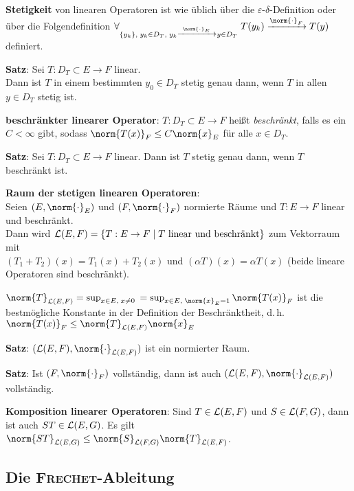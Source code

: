 \textbf{Stetigkeit} von linearen Operatoren ist wie üblich über die
$\varepsilon$-$\delta$-Definition oder über die Folgendefinition
$\forall_{\{y_k\},\; y_k \in D_T,\;
y_k \xrightarrow{\norm{\cdot}_E} y \in D_T}\;
T(y_k) \xrightarrow{\norm{\cdot}_F} T(y)$ definiert.

\textbf{Satz}: Sei $T: D_T \subset E \rightarrow F$ linear. \\
Dann ist $T$ in einem bestimmten $y_0 \in D_T$ stetig genau dann,
wenn $T$ in allen $y \in D_T$ stetig ist.

\textbf{beschränkter linearer Operator}:
$T: D_T \subset E \rightarrow F$ heißt \emph{beschränkt},
falls es ein $C < \infty$ gibt, sodass
$\norm{T(x)}_F \le C \norm{x}_E$ für alle $x \in D_T$.

\textbf{Satz}:
Sei $T: D_T \subset E \rightarrow F$ linear.
Dann ist $T$ stetig genau dann, wenn $T$ beschränkt ist.

\linie

\textbf{Raum der stetigen linearen Operatoren}: \\
Seien $(E, \norm{\cdot}_E)$ und $(F, \norm{\cdot}_F)$ normierte Räume
und $T: E \rightarrow F$ linear und beschränkt. \\
Dann wird $\mathcal{L}(E,F) =
\{T: E \rightarrow F \;|\; T \text{ linear und beschränkt}\}$
zum Vektorraum mit \\
$(T_1 + T_2)(x) = T_1(x) + T_2(x)$ und
$(\alpha T)(x) = \alpha T(x)$ (beide lineare Operatoren sind beschränkt).

$\norm{T}_{\L(E,F)} = \sup_{x \in E,\; x \not= 0}$
$= \sup_{x \in E,\; \norm{x}_E = 1} \norm{T(x)}_F$
ist die bestmögliche Konstante in der Definition der Beschränktheit,
d.\,h. $\norm{T(x)}_F \le \norm{T}_{\L(E,F)} \norm{x}_E$

\textbf{Satz}:
$(\L(E,F), \norm{\cdot}_{\L(E,F)})$ ist ein normierter Raum.

\textbf{Satz}:
Ist $(F, \norm{\cdot}_F)$ vollständig, dann ist auch
$(\L(E,F), \norm{\cdot}_{\L(E,F)})$ vollständig.

\linie

\textbf{Komposition linearer Operatoren}:
Sind $T \in \mathcal{L}(E,F)$ und $S \in \mathcal{L}(F,G)$, dann ist
auch $ST \in \mathcal{L}(E,G)$.
Es gilt $\norm{ST}_{\L(E,G)} \le \norm{S}_{\L(F,G)} \norm{T}_{\L(E,F)}$.

\subsection{%
    Die \textsc{Frechet}-Ableitung%
}

